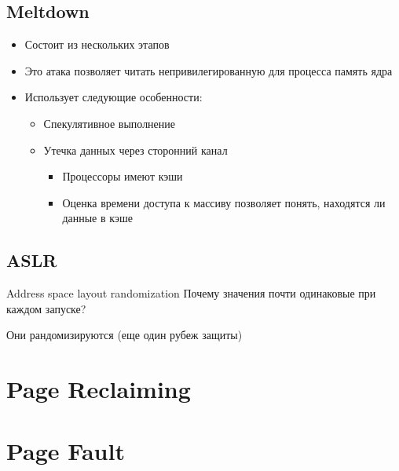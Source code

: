 \documentclass[../../lectures.tex]{subfiles}
\begin{document}
\subsection{Meltdown}
\begin{itemize}
    \item Состоит из нескольких этапов
    \item Это атака позволяет читать непривилегированную для процесса память ядра
    \item Использует следующие особенности:
          \begin{itemize}
              \item Спекулятивное выполнение
              \item Утечка данных через сторонний канал
                  \begin{itemize}
                      \item Процессоры имеют кэши
                      \item Оценка времени доступа к массиву позволяет понять, находятся ли данные в кэше
                  \end{itemize}
          \end{itemize}
\end{itemize}

\subsection{ASLR}
Address space layout randomization
Почему значения почти одинаковые при каждом запуске?

Они рандомизируются (еще один рубеж защиты)

\section{Page Reclaiming}

\section{Page Fault}
\end{document}
